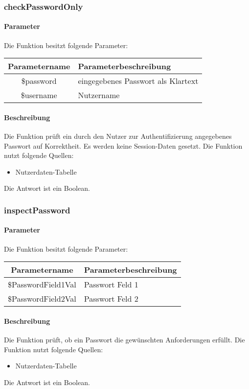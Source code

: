 \subsubsection{checkPasswordOnly}
\paragraph{Parameter} Die Funktion besitzt folgende Parameter:
\begin{table}[H]
	\begin{tabular}{|c|p{11cm}|}
		\hline
		\textbf{Parametername} & \textbf{Parameterbeschreibung} \\ \hline
		\$password & eingegebenes Passwort als Klartext \\ \hline
		\$username & Nutzername \\ \hline
	\end{tabular}
\end{table}
\paragraph{Beschreibung} Die Funktion prüft ein durch den Nutzer zur Authentifizierung angegebenes Passwort auf Korrektheit. Es werden keine Session-Daten gesetzt. Die Funktion nutzt folgende Quellen:
\begin{itemize}
	\item Nutzerdaten-Tabelle
\end{itemize}
Die Antwort ist ein Boolean.
\subsubsection{inspectPassword}
\paragraph{Parameter} Die Funktion besitzt folgende Parameter:
\begin{table}[H]
	\begin{tabular}{|c|p{11cm}|}
		\hline
		\textbf{Parametername} & \textbf{Parameterbeschreibung} \\ \hline
		\$PasswordField1Val & Passwort Feld 1 \\ \hline
		\$PasswordField2Val & Passwort Feld 2 \\ \hline
	\end{tabular}
\end{table}
\paragraph{Beschreibung} Die Funktion prüft, ob ein Passwort die gewünschten Anforderungen erfüllt. Die Funktion nutzt folgende Quellen:
\begin{itemize}
	\item Nutzerdaten-Tabelle
\end{itemize}
Die Antwort ist ein Boolean.
